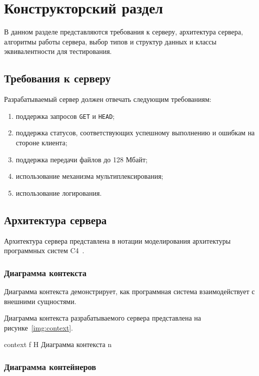 \chapter{Конструкторский раздел}

В данном разделе представляются требования к серверу, архитектура сервера, алгоритмы работы сервера, выбор типов и структур данных и классы эквивалентности для тестирования.

\section{Требования к серверу}

Разрабатываемый сервер должен отвечать следующим требованиям:
\begin{enumerate}
	\item поддержка запросов \texttt{GET} и \texttt{HEAD};
	\item поддержка статусов, соответствующих успешному выполнению и ошибкам на стороне клиента;
	\item поддержка передачи файлов до 128 Мбайт;
	\item использование механизма мультиплексирования;
	\item использование логирования.
\end{enumerate}

\section{Архитектура сервера}

Архитектура сервера представлена в нотации моделирования архитектуры программных систем C4~\cite{c4}.  

\subsection{Диаграмма контекста}

Диаграмма контекста демонстрирует, как программная система взаимодействует с внешними сущностями. 

Диаграмма контекста разрабатываемого сервера представлена на рисунке~\ref{img:context}.

{context}
{f} %
{H}
{\textwidth} %
{Диаграмма контекста}
{n}

\subsection{Диаграмма контейнеров}


